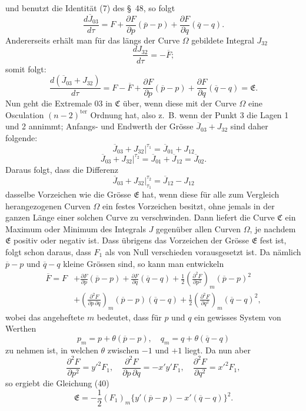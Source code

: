 \documentclass[11pt,a4paper,leqno]{article}
\begin{document}
und benutzt die Identität (7) des \S~48, so folgt
\[
\frac{d\overline{J}_{03}}{d\tau}
=F+\frac{\partial F}{\partial p}(\overline{p}-p)
+\frac{\partial F}{\partial q}(\overline{q}-q).
\]
Andererseits erhält man für das längs der Curve $\Omega$ gebildete Integral $J_{32}$
\[
\frac{dJ_{32}}{d\tau}=-\overline{F};
\]
somit folgt:
\begin{equation}\tag{40}
\frac{d(\overline{J}_{03}+J_{32})}{d\tau}
=F-\overline{F}+\frac{\partial F}{\partial p}(\overline{p}-p)
+\frac{\partial F}{\partial q}(\overline{q}-q)=\mathfrak{E}.
\end{equation}
Nun geht die Extremale 03 in $\mathfrak{C}$ über, wenn diese mit der Curve $\Omega$ eine Osculation $(n-2)^{\mathrm{ter}}$ Ordnung hat, also z.~B. wenn der Punkt 3 die Lagen 1 und 2 annimmt; Anfangs- und Endwerth der Grösse $\overline{J}_{03}+J_{32}$ sind daher folgende:
\[
\overline{J}_{03}+J_{32}\bigg|^{\tau_1}
=\overline{J}_{01}+J_{12}
\]
\[
\overline{J}_{03}+J_{32}\bigg|^{\tau_2}
=\overline{J}_{01}+\overline{J}_{12}=\overline{J}_{02}.
\]
Daraus folgt, dass die Differenz
\[
\overline{J}_{03}+J_{32}\bigg|_{\tau_1}^{\tau_2}=\overline{J}_{12}-J_{12}
\]
dasselbe Vorzeichen wie die Grösse $\mathfrak{E}$ hat, wenn diese für alle zum Vergleich herangezogenen Curven $\Omega$ ein festes Vorzeichen besitzt, ohne jemals in der ganzen Länge einer solchen Curve zu verschwinden. Dann liefert die Curve $\mathfrak{C}$ ein Maximum oder
Minimum des Integrals $J$ gegenüber allen Curven $\Omega$, je nachdem $\mathfrak{E}$ positiv oder negativ ist. Dass übrigens das Vorzeichen der Grösse $\mathfrak{E}$ fest ist, folgt schon daraus, dass $F_1$ als von Null verschieden vorausgesetzt ist. Da nämlich $\overline{p}-p$ und $\overline{q}-q$ kleine Grössen sind, so kann man entwickeln
\[
\begin{aligned}
\overline{F}=F&+\frac{\partial F}{\partial p}(\overline{p}-p)
+\frac{\partial F}{\partial q}(\overline{q}-q)
+\frac12\left(\frac{\partial^2F}{\partial p^2}\right)_m(\overline{p}-p)^2\\
&+\left(\frac{\partial^2F}{\partial p\,\partial q}\right)_m
(\overline{p}-p)(\overline{q}-q)
+\frac12\left(\frac{\partial^2F}{\partial q^2}\right)_m(\overline{q}-q)^2,
\end{aligned}
\]
wobei das angeheftete $m$ bedeutet, dass für $p$ und $q$ ein gewisses System von Werthen
\[
p_m=p+\theta(\overline{p}-p),\quad
q_m=q+\theta(\overline{q}-q)
\]
zu nehmen ist, in welchen $\theta$ zwischen $-1$ und $+1$ liegt. Da nun aber
\[
\frac{\partial^2F}{\partial p^2}=y'^2F_1,\quad
\frac{\partial^2F}{\partial p\,\partial q}=-x'y'F_1,\quad
\frac{\partial^2F}{\partial q^2}=x'^2F_1,
\]
so ergiebt die Gleichung (40)
\[
\mathfrak{E}=-\frac12(F_1)_m\{y'(\overline{p}-p)-x'(\overline{q}-q)\}^2.
\]
\end{document}
